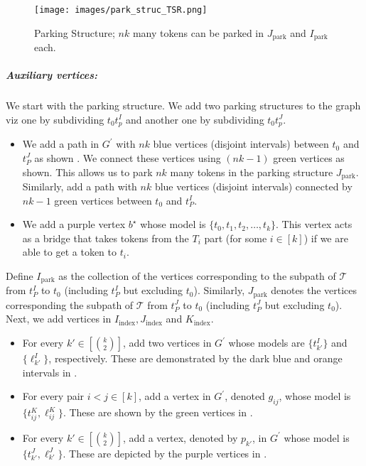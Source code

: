 \begin{figure}[t]
\centering
\texttt{[image: images/park\_struc\_TSR.png]}
\caption{Parking Structure; $nk$ many tokens can be parked in $J_{\text{park}}$ and $I_{\text{park}}$ each.}
\label{park_struc_TSR}
\vspace{-5mm}
\end{figure}

\subparagraph*{Auxiliary vertices:}
We start with the parking structure.
We add two parking structures to the graph
viz one by subdividing $t_0t^I_p$ and another one by
subdividing $t_0t^J_p$.
\begin{itemize}
\item We add a path in $G^\prime$ with $nk$ blue vertices
(disjoint intervals) between $t_0$ and $t_P^J$ as shown .
We connect these vertices using $(nk-1)$ green vertices as shown.
This allows us to park $nk$ many tokens in the
parking structure $J_\text{park}$.
Similarly, add a path with $nk$ blue vertices (disjoint intervals)
connected by $nk-1$ green vertices between $t_0$ and $t_P^I$.
\item We add a purple vertex $b^\star$ whose model is
$\{t_0,t_1,t_2,\ldots,t_k\}$.
This vertex acts as a bridge that takes tokens from the
$T_i$ part (for some $i\in [k]$) if we are able to get a token to $t_i$.
\end{itemize}
Define $I_{\text{park}}$ as the collection of the vertices
corresponding to the subpath of $\mathcal{T}$ from
$t_P^I$ to $t_0$ (including $t_P^I$ but excluding $t_0$).
Similarly, $J_{\text{park}}$ denotes the vertices corresponding
the subpath of $\mathcal{T}$ from $t_P^J$ to $t_0$
(including $t_P^J$ but excluding $t_0$).
Next, we add vertices in $I_{\text{index}}, J_{\text{index}}$ and
$K_{\text{index}}$.
\begin{itemize}
\item For every $k' \in [\binom{k}{2}]$,
add two vertices in $G^{\prime}$ whose models are
$\{t^I_{k'}\}$ and $\{\ell^I_{k'}\}$, respectively.
These are demonstrated by the dark blue and
orange intervals
in .
\item For every pair $i < j \in [k]$, add a vertex in $G^{\prime}$,
denoted $g_{ij}$, whose model is $\{t^K_{ij},\ell^K_{ij}\}$.
These are shown by the green vertices in .
\item For every $k' \in [\binom{k}{2}]$,
add a vertex, denoted by $p_{k'}$, in $G^{\prime}$
whose model is $\{t^J_{k'},\ell^J_{k'}\}$.
These are depicted by the purple vertices in
.
\end{itemize}
